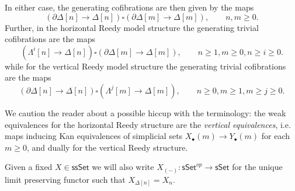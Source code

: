 \documentclass[a4paper,10pt
]{article}%
\begin{document}
In either case, the generating cofibrations are then given by the maps
\[
	\left( \partial \Delta[n] \to \Delta[n] \right)
\square
	\left( \partial \Delta[m] \to \Delta[m] \right),
	\qquad n,m\geq 0.
\]
Further, in the horizontal Reedy model structure the generating trivial cofibrations are the maps
\begin{equation}\label{GTRCOHOR EQ}
	\left( \Lambda^i[n] \to \Delta[n] \right)
\square
	\left( \partial \Delta[m] \to \Delta[m] \right),
\qquad n \geq 1, m\geq 0, n \geq i \geq 0.
\end{equation}
while for the vertical Reedy model structure the generating trivial cofibrations are the maps
\begin{equation}\label{GTRCOVER EQ}
	\left( \partial \Delta[n] \to \Delta[n] \right)
\square
	\left( \Lambda^j[m] \to \Delta[m] \right),
\qquad n\geq 0, m\geq 1,m\geq j \geq 0.
\end{equation}

We caution the reader about a possible hiccup with the terminology: 
the weak equivalences for the horizontal Reedy structure are the 
\textit{vertical equivalences},
i.e. maps inducing Kan equivalences of simplicial sets
$X_{\bullet}(m) \to Y_{\bullet}(m)$
for each $m \geq 0$, and dually for the vertical Reedy structure.

\begin{notation}\label{UNIQUELIM NOT}
	Given a fixed $X \in \mathsf{ssSet}$ we will also write
	$X_{(-)} \colon \mathsf{sSet}^{op} \to \mathsf{sSet}$
	for the unique limit preserving functor such that
	$X_{\Delta[n]} = X_n$.
\end{notation}

\end{document}
